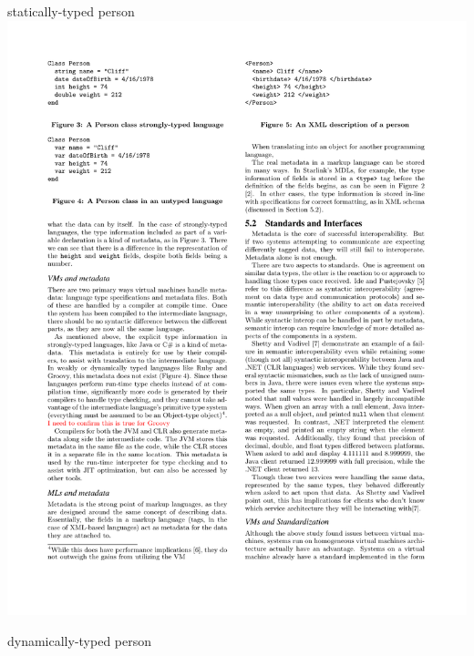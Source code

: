 \documentclass{beamer}
\newcommand{\linespace}{\vskip 0.25cm}
\begin{document}
\begin{frame}
\begin{columns}
\begin{column}{0.5\textwidth}
  \tiny{statically-typed person}
  \linespace
  \linespace
  \includegraphics[scale=1]{graphics/UnTypeCliff.pdf}
  
  \tiny{dynamically-typed person}
  \end{column}
  \end{columns}
\end{frame}
\end{document}
